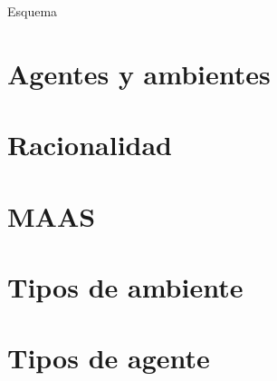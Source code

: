 \begin{frame}{Esquema}
  \tableofcontents%
 
\end{frame}

\section{Agentes y ambientes}%

\section{Racionalidad}%

\section{MAAS}%

\section{Tipos de ambiente}%

\section{Tipos de agente} %


